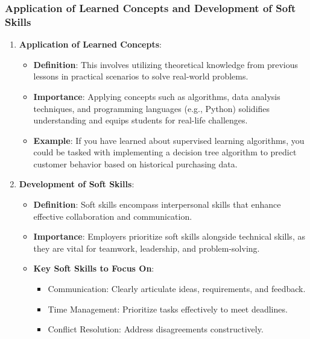 \documentclass{beamer}
\begin{document}
\begin{frame}[fragile]
    \frametitle{Application of Learned Concepts and Development of Soft Skills}
    \begin{enumerate}
        \item \textbf{Application of Learned Concepts}:
            \begin{itemize}
                \item \textbf{Definition}:
                    This involves utilizing theoretical knowledge from previous lessons in practical scenarios 
                    to solve real-world problems.
                \item \textbf{Importance}:
                    Applying concepts such as algorithms, data analysis techniques, and programming languages 
                    (e.g., Python) solidifies understanding and equips students for real-life challenges.
                \item \textbf{Example}:
                    If you have learned about supervised learning algorithms, you could be tasked with 
                    implementing a decision tree algorithm to predict customer behavior based on historical 
                    purchasing data.
            \end{itemize}
        \item \textbf{Development of Soft Skills}:
            \begin{itemize}
                \item \textbf{Definition}:
                    Soft skills encompass interpersonal skills that enhance effective collaboration and 
                    communication.
                \item \textbf{Importance}:
                    Employers prioritize soft skills alongside technical skills, as they are vital for teamwork, 
                    leadership, and problem-solving.
                \item \textbf{Key Soft Skills to Focus On}:
                    \begin{itemize}
                        \item Communication: Clearly articulate ideas, requirements, and feedback.
                        \item Time Management: Prioritize tasks effectively to meet deadlines.
                        \item Conflict Resolution: Address disagreements constructively.
                    \end{itemize}
            \end{itemize}
    \end{enumerate}
\end{frame}
\end{document}
